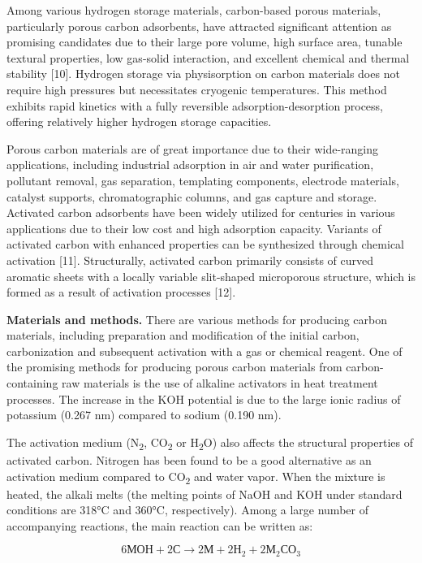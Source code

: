 \begin{multicols}{2}
Among various hydrogen storage materials, carbon-based porous materials,
particularly porous carbon adsorbents, have attracted significant
attention as promising candidates due to their large pore volume, high
surface area, tunable textural properties, low gas-solid interaction,
and excellent chemical and thermal stability {[}10{]}. Hydrogen storage
via physisorption on carbon materials does not require high pressures
but necessitates cryogenic temperatures. This method exhibits rapid
kinetics with a fully reversible adsorption-desorption process, offering
relatively higher hydrogen storage capacities.

Porous carbon materials are of great importance due to their
wide-ranging applications, including industrial adsorption in air and
water purification, pollutant removal, gas separation, templating
components, electrode materials, catalyst supports, chromatographic
columns, and gas capture and storage. Activated carbon adsorbents have
been widely utilized for centuries in various applications due to their
low cost and high adsorption capacity. Variants of activated carbon with
enhanced properties can be synthesized through chemical activation
{[}11{]}. Structurally, activated carbon primarily consists of curved
aromatic sheets with a locally variable slit-shaped microporous
structure, which is formed as a result of activation processes {[}12{]}.

{\bfseries Materials and methods.} There are various methods for producing
carbon materials, including preparation and modification of the initial
carbon, carbonization and subsequent activation with a gas or chemical
reagent. One of the promising methods for producing porous carbon
materials from carbon-containing raw materials is the use of alkaline
activators in heat treatment processes. The increase in the KOH
potential is due to the large ionic radius of potassium (0.267 nm)
compared to sodium (0.190 nm).

The activation medium (N\textsubscript{2}, CO\textsubscript{2} or
H\textsubscript{2}O) also affects the structural properties of activated
carbon. Nitrogen has been found to be a good alternative as an
activation medium compared to CO\textsubscript{2} and water vapor. When
the mixture is heated, the alkali melts (the melting points of NaOH and
KOH under standard conditions are 318°C and 360°C, respectively). Among
a large number of accompanying reactions, the main reaction can be
written as:

\[6\text{МОН} + 2\text{С} \rightarrow 2\text{М} + 2\text{Н}_{2} + 2\text{М}_{2}\text{СО}_{3}\]


\end{multicols}
